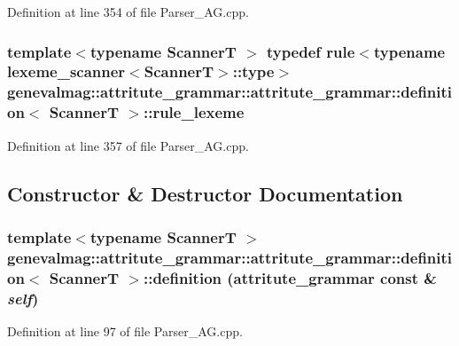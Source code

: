 Definition at line 354 of file Parser\_\-AG.cpp.\hypertarget{structgenevalmag_1_1attritute__grammar_1_1definition_af4afa908dd79792cfa7d2a3963b80d6}{
\subsubsection[{rule\_\-lexeme}]{\setlength{\rightskip}{0pt plus 5cm}template$<$typename ScannerT $>$ typedef rule$<$typename lexeme\_\-scanner$<$ScannerT$>$::type$>$ genevalmag::attritute\_\-grammar::attritute\_\-grammar::definition$<$ ScannerT $>$::{\bf rule\_\-lexeme}}}
\label{structgenevalmag_1_1attritute__grammar_1_1definition_af4afa908dd79792cfa7d2a3963b80d6}




Definition at line 357 of file Parser\_\-AG.cpp.

\subsection{Constructor \& Destructor Documentation}
\hypertarget{structgenevalmag_1_1attritute__grammar_1_1definition_c6f9c82048aa8a9bd84717dec76c4218}{
\subsubsection[{definition}]{\setlength{\rightskip}{0pt plus 5cm}template$<$typename ScannerT $>$ genevalmag::attritute\_\-grammar::attritute\_\-grammar::definition$<$ ScannerT $>$::{\bf definition} ({\bf attritute\_\-grammar} const \& {\em self})}}
\label{structgenevalmag_1_1attritute__grammar_1_1definition_c6f9c82048aa8a9bd84717dec76c4218}




Definition at line 97 of file Parser\_\-AG.cpp.


